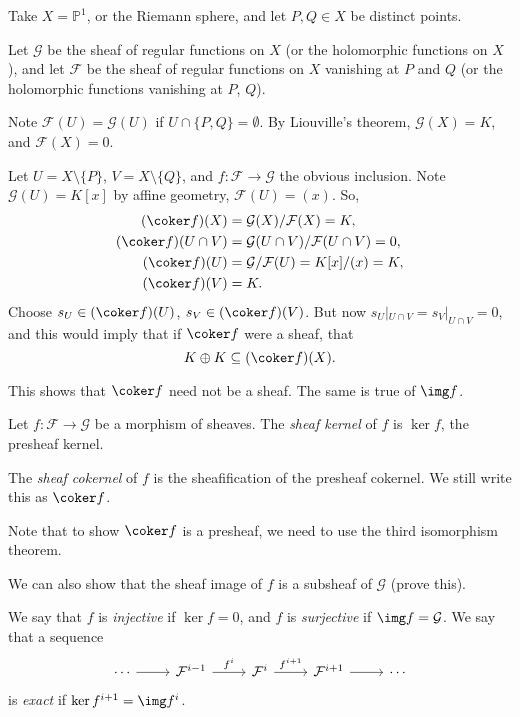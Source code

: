 \documentclass[12pt]{article}
\begin{document}
\begin{exbox}
	Take $X = \mathbb{P}^1$, or the Riemann sphere, and let $P, Q \in X$ be distinct points.

	Let $\mathcal{G}$ be the sheaf of regular functions on $X$ (or the holomorphic functions on $X$), and let $\mathcal{F}$ be the sheaf of regular functions on $X$ vanishing at $P$ and $Q$ (or the holomorphic functions vanishing at $P$, $Q$).

	Note $\mathcal{F}(U) = \mathcal{G}(U)$ if $U \cap \{P, Q\} = \emptyset$. By Liouville's theorem, $\mathcal{G}(X) = K$, and $\mathcal{F}(X) = 0$.

	Let $U = X \setminus \{P\}$, $V = X \setminus \{Q\}$, and $f : \mathcal{F} \to \mathcal{G}$ the obvious inclusion. Note $\mathcal{G}(U) = K[x]$ by affine geometry, $\mathcal{F}(U) = (x)$. So,
	\begin{align*}
		(\coker f)(X) &= \mathcal{G}(X) / \mathcal{F}(X) = K, \\
		(\coker f)(U \cap V) &= \mathcal{G}(U \cap V) / \mathcal{F}(U \cap V) = 0, \\
		(\coker f)(U) &= \mathcal{G} / \mathcal{F}(U)=  K[x]/(x) = K, \\
		(\coker f)(V) &= K.
	\end{align*}
	Choose $s_U \in (\coker f)(U)$, $s_V \in (\coker f)(V)$. But now $s_U|_{U \cap V} = s_V|_{U \cap V} = 0$, and this would imply that if $\coker f$ were a sheaf, that
	\[
	K \oplus K \subseteq (\coker f)(X).
	\]
\end{exbox}

\begin{remark}
	This shows that $\coker f$ need not be a sheaf. The same is true of $\img f$.
\end{remark}

\begin{definition}
	Let $f : \mathcal{F} \to \mathcal{G}$ be a morphism of sheaves. The \emph{sheaf kernel} of $f$ is $\ker f$, the presheaf kernel.

	The \emph{sheaf cokernel} of $f$ is the sheafification of the presheaf cokernel. We still write this as $\coker f$.
\end{definition}

Note that to show $\coker f$ is a presheaf, we need to use the third isomorphism theorem.

We can also show that the sheaf image of $f$ is a subsheaf of $\mathcal{G}$ (prove this).

We say that $f$ is \emph{injective} if $\ker f = 0$, and $f$ is \emph{surjective} if $\img f = \mathcal{G}$. We say that a sequence
\[
\begin{tikzcd}
	\cdots \arrow[r, ""] & \mathcal{F}^{i-1} \arrow[r, "f^i"] & \mathcal{F}^i \arrow[r, "f^{i+1}"] & \mathcal{F}^{i+1} \arrow[r, ""] & \cdots
\end{tikzcd}
\]
is \emph{exact} if $\ker f^{i+1} = \img f^{i}$.
\end{document}
